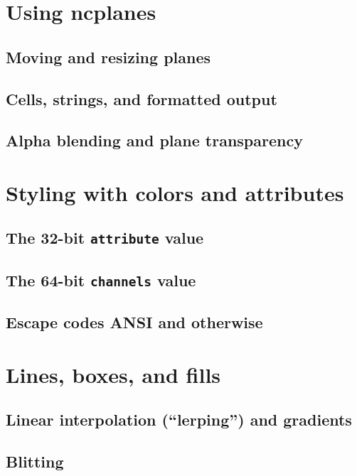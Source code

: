 \documentclass[letterpaper,10pt]{article}
\begin{document}
\newpage
\section{Using ncplanes}
\label{ncplane}
\subsection{Moving and resizing planes}
\subsection{Cells, strings, and formatted output}
\subsection{Alpha blending and plane transparency}

\section{Styling with colors and attributes}
\subsection{The 32-bit \texttt{attribute} value}
\label{sec:attribute}
\subsection{The 64-bit \texttt{channels} value}
\label{sec:channels}
\subsection{Escape codes ANSI and otherwise}
\label{sec:escapes}

\section{Lines, boxes, and fills}
\subsection{Linear interpolation (``lerping'') and gradients}
\subsection{Blitting}
\end{document}

